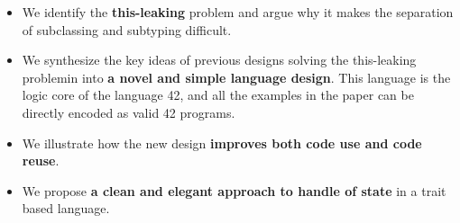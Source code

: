 





\begin{itemize}
\item We identify the {\bf this-leaking} problem and argue why it
  makes the separation of subclassing and subtyping difficult.
\item We synthesize the key ideas of previous designs solving the
  this-leaking problemin into {\bf a novel and
  simple language design}. This language is the logic core of the language 42, and 
  all the examples in the paper can be directly encoded as valid 42 programs. 

\item We illustrate how the new design {\bf improves both code use and code
  reuse}.
\item We propose {\bf a clean and elegant approach to handle of state} in a trait based language.

\end{itemize}


\saveSpace
\saveSpace

